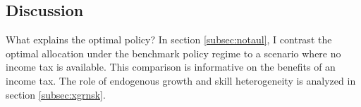 %




\subsection{Discussion}\label{subsec:dis}

 What explains the optimal policy?
 In section \ref{subsec:notaul}, I contrast the optimal allocation under the benchmark policy regime to a scenario where no income tax is available.  This comparison is informative on the benefits of an income tax. The role of endogenous growth and skill heterogeneity is analyzed in section \ref{subsec:xgrnsk}.

